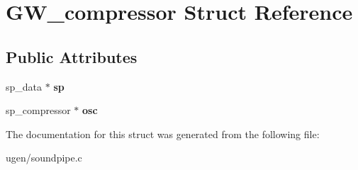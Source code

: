 \hypertarget{structGW__compressor}{}\section{G\+W\+\_\+compressor Struct Reference}
\label{structGW__compressor}
\subsection*{Public Attributes}
\begin{DoxyCompactItemize}
\item 
\hypertarget{structGW__compressor_a1cf7e45b1d1a55b3a7ec993c85b5845c}{}\label{structGW__compressor_a1cf7e45b1d1a55b3a7ec993c85b5845c} 
sp\+\_\+data $\ast$ {\bfseries sp}
\item 
\hypertarget{structGW__compressor_a2f86835e4d575ffa1eea0b62c9bfdaa7}{}\label{structGW__compressor_a2f86835e4d575ffa1eea0b62c9bfdaa7} 
sp\+\_\+compressor $\ast$ {\bfseries osc}
\end{DoxyCompactItemize}


The documentation for this struct was generated from the following file\+:\begin{DoxyCompactItemize}
\item 
ugen/soundpipe.\+c\end{DoxyCompactItemize}
